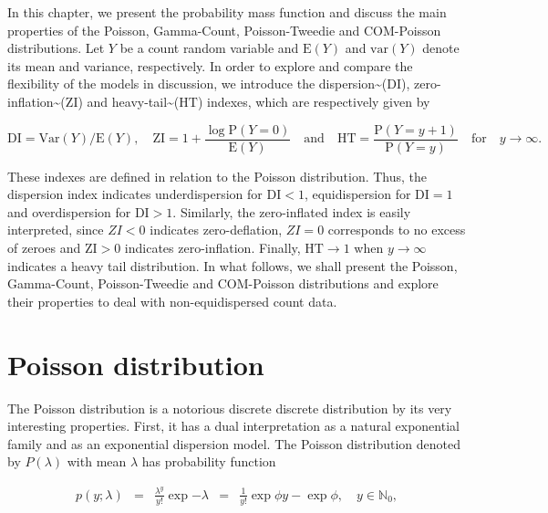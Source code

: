 \documentclass[9pt,a5paper,]{book}
\begin{document}
In this chapter, we present the probability mass function and discuss
the main properties of the Poisson, Gamma-Count, Poisson-Tweedie and
COM-Poisson distributions. Let \(Y\) be a count random variable and
\(\mathrm{E}(Y)\) and \(\mathrm{var}(Y)\) denote its mean and variance,
respectively. In order to explore and compare the flexibility of the
models in discussion, we introduce the
dispersion\textasciitilde{}(\(\mathrm{DI}\)),
zero-inflation\textasciitilde{}(\(\mathrm{ZI}\)) and
heavy-tail\textasciitilde{}(\(\mathrm{HT}\)) indexes, which are
respectively given by

\begin{equation}
\mathrm{DI} = \mathrm{Var}(Y)/\mathrm{E}(Y), \quad \mathrm{ZI} = 1 + \frac{\log \mathrm{P}(Y = 0)}{\mathrm{E}(Y)} \quad \text{and} \quad
\mathrm{HT} = \frac{\mathrm{P}(Y=y+1)}{\mathrm{P}(Y=y)}\quad \text{for} \quad y \to \infty. 
\end{equation}

These indexes are defined in relation to the Poisson distribution. Thus,
the dispersion index indicates underdispersion for \(\mathrm{DI} < 1\),
equidispersion for \(\mathrm{DI} = 1\) and overdispersion for
\(\mathrm{DI} > 1\). Similarly, the zero-inflated index is easily
interpreted, since \(ZI < 0\) indicates zero-deflation, \(ZI = 0\)
corresponds to no excess of zeroes and \(\mathrm{ZI} > 0\) indicates
zero-inflation. Finally, \(\mathrm{HT} \to 1\) when \(y \to \infty\)
indicates a heavy tail distribution. In what follows, we shall present
the Poisson, Gamma-Count, Poisson-Tweedie and COM-Poisson distributions
and explore their properties to deal with non-equidispersed count data.

\section{Poisson distribution}\label{poisson-distribution}

The Poisson distribution is a notorious discrete discrete distribution
by its very interesting properties. First, it has a dual interpretation
as a natural exponential family and as an exponential dispersion model.
The Poisson distribution denoted by \(P(\lambda)\) with mean \(\lambda\)
has probability function

\begin{eqnarray}
p(y;\lambda) &=& \frac{\lambda^y}{y!}\exp{-\lambda}
         &=& \frac{1}{y!} \exp{\phi y -  \exp{\phi} }, \quad y \in \mathbb{N}_{0},  
\end{eqnarray}
\end{document}
